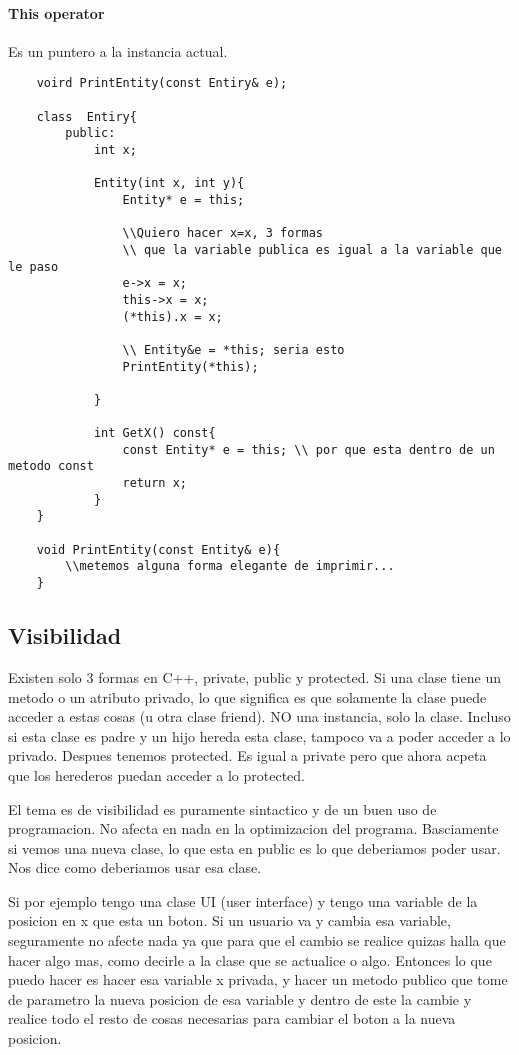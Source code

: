 \documentclass[11pt]{article}
\begin{document}
\paragraph{This operator}
Es un puntero a la instancia actual.
\begin{lstlisting}
    voird PrintEntity(const Entiry& e);

    class  Entiry{
        public:
            int x;

            Entity(int x, int y){
                Entity* e = this;

                \\Quiero hacer x=x, 3 formas
                \\ que la variable publica es igual a la variable que le paso
                e->x = x;
                this->x = x;
                (*this).x = x;

                \\ Entity&e = *this; seria esto
                PrintEntity(*this);

            }

            int GetX() const{
                const Entity* e = this; \\ por que esta dentro de un metodo const
                return x;
            }
    }

    void PrintEntity(const Entity& e){
        \\metemos alguna forma elegante de imprimir...
    }
\end{lstlisting}

\subsection{Visibilidad}
Existen solo 3 formas en C++, private, public y protected.
Si una clase tiene un metodo o un atributo privado, lo que significa es que solamente
la clase puede acceder a estas cosas (u otra clase friend).
NO una instancia, solo la clase.
Incluso si esta clase es padre y un hijo hereda esta clase, tampoco va a poder
acceder a lo privado.
Despues tenemos protected. Es igual a private pero que ahora acpeta que los
herederos puedan acceder a lo protected.

El tema es de visibilidad es puramente sintactico y de un buen uso de programacion.
No afecta en nada en la optimizacion del programa.
Basciamente si vemos una nueva clase, lo que esta en public es lo que deberiamos
poder usar.
Nos dice como deberiamos usar esa clase.

Si por ejemplo tengo una clase UI (user interface) y tengo una variable de la
posicion en x que esta un boton.
Si un usuario va y cambia esa variable, seguramente no afecte nada ya que para
que el cambio se realice quizas halla que hacer algo mas, como decirle a la clase
que se actualice o algo.
Entonces lo que puedo hacer es hacer esa variable x privada, y hacer un metodo
publico que tome de parametro la nueva posicion de esa variable y dentro de este
la cambie y realice todo el resto de cosas necesarias para cambiar el boton a la
nueva posicion.
\end{document}
